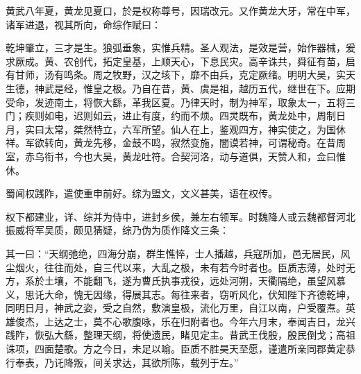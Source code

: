\documentclass[12pt,UTF8]{ctexbook}
\begin{document}
黄武八年夏，黄龙见夏口，於是权称尊号，因瑞改元。又作黄龙大牙，常在中军，诸军进退，视其所向，命综作赋曰：

乾坤肇立，三才是生。狼弧垂象，实惟兵精。圣人观法，是效是营，始作器械，爰求厥成。黄、农创代，拓定皇基，上顺天心，下息民灾。高辛诛共，舜征有苗，启有甘师，汤有鸣条。周之牧野，汉之垓下，靡不由兵，克定厥绪。明明大吴，实天生德，神武是经，惟皇之极。乃自在昔，黄、虞是祖，越历五代，继世在下。应期受命，发迹南土，将恢大繇，革我区夏。乃律天时，制为神军，取象太一，五将三门；疾则如电，迟则如云，进止有度，约而不烦。四灵既布，黄龙处中，周制日月，实曰太常，桀然特立，六军所望。仙人在上，鉴观四方，神实使之，为国休祥。军欲转向，黄龙先移，金鼓不鸣，寂然变施，闇谟若神，可谓秘奇。在昔周室，赤乌衔书，今也大吴，黄龙吐符。合契河洛，动与道俱，天赞人和，佥曰惟休。

蜀闻权践阼，遣使重申前好。综为盟文，文义甚美，语在权传。

权下都建业，详、综并为侍中，进封乡侯，兼左右领军。时魏降人或云魏都督河北振威将军吴质，颇见猜疑，综乃伪为质作降文三条：

其一曰：“天纲弛绝，四海分崩，群生憔悴，士人播越，兵寇所加，邑无居民，风尘烟火，往往而处，自三代以来，大乱之极，未有若今时者也。臣质志薄，处时无方，系於土壤，不能翻飞，遂为曹氏执事戎役，远处河朔，天衢隔绝，虽望风慕义，思讬大命，愧无因缘，得展其志。每往来者，窃听风化，伏知陛下齐德乾坤，同明日月，神武之姿，受之自然，敷演皇极，流化万里，自江以南，户受覆焘。英雄俊杰，上达之士，莫不心歌腹咏，乐在归附者也。今年六月末，奉闻吉日，龙兴践阼，恢弘大繇，整理天纲，将使遗民，睹见定主。昔武王伐殷，殷民倒戈；高祖诛项，四面楚歌。方之今日，未足以喻。臣质不胜昊天至愿，谨遣所亲同郡黄定恭行奉表，乃讬降叛，间关求达，其欲所陈，载列于左。”
\end{document}
